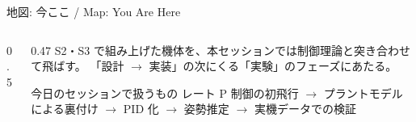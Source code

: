 
\providecommand{\scisessionmap}[1]{}

\begin{frame}{地図: 今ここ / Map: You Are Here}
  \begin{columns}[T]
    \begin{column}{0.5\textwidth}
      \centering
      \resizebox{\columnwidth}{!}{\scisessionmap{4}}
    \end{column}
    \begin{column}{0.47\textwidth}
      \small
      S2・S3 で組み上げた機体を、本セッションでは制御理論と突き合わせて飛ばす。
      「設計 $\to$ 実装」の次にくる「実験」のフェーズにあたる。

      \vspace{0.5em}

      \begin{block}{今日のセッションで扱うもの}
        \footnotesize
        レート P 制御の初飛行 $\to$ プラントモデルによる裏付け $\to$ PID 化 $\to$
        姿勢推定 $\to$ 実機データでの検証
      \end{block}
    \end{column}
  \end{columns}
\end{frame}

